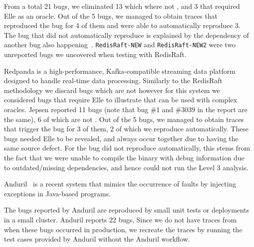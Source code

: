 From a total 21 bugs, we eliminated 13 which where not \efibshort, and 3 that required Elle as an oracle.
Out of the 5 bugs, we managed to obtain traces that reproduced the bug for 4 of them and were able to automatically reproduce 3.
The bug that \sys did not automatically reproduce is explained by the dependency of another bug also happening~\cite{redisraftreport}.
\texttt{RedisRaft-NEW} and \texttt{RedisRaft-NEW2} were two unreported bugs we uncovered when testing with RedisRaft.

Redpanda is a high-performance, Kafka-compatible streaming data platform designed to handle real-time data processing.
Similarly to the RedisRaft methodology we discard bugs which are not \efibshort however for this system we considered bugs that require Elle to illustrate that \sys can be used with complex oracles.
Jepsen reported 11 bugs (note that bug \#1 and \#3039 in the report are the same), 6 of which are not \efibshort.
Out of the 5 bugs, we managed to obtain traces that trigger the bug for 3 of them, 2 of which we reproduce automatically.
These bugs needed Elle to be revealed, and always occur together due to having the same source defect.
For the bug \sys did not reproduce automatically, this stems from the fact that we were unable to compile the binary with debug information due to outdated/missing dependencies, and hence \sys could not run the Level 3 analysis.

Anduril~\cite{anduril} is a recent system that mimics the occurrence of faults by injecting exceptions in Java-based programs.

The bugs reported by Anduril are reproduced by small unit tests or deployments in a small cluster.
Anduril reports 22 bugs, 
Since we do not have traces from when these bugs occurred in production, we recreate the traces by running the test cases provided by Anduril without the Anduril workflow.

